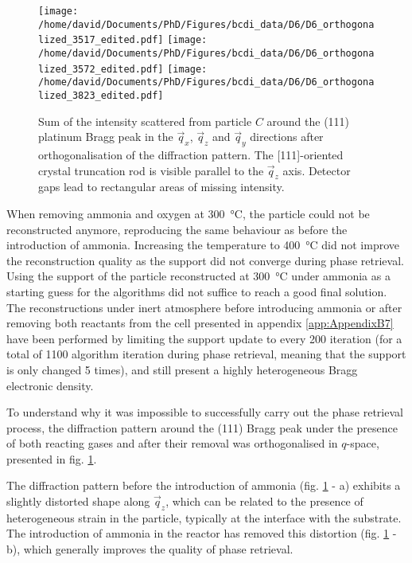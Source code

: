 \begin{figure}[!htb]
    \centering
    \texttt{[image: /home/david/Documents/PhD/Figures/bcdi\_data/D6/D6\_orthogonalized\_3517\_edited.pdf]}
    \texttt{[image: /home/david/Documents/PhD/Figures/bcdi\_data/D6/D6\_orthogonalized\_3572\_edited.pdf]}
    \texttt{[image: /home/david/Documents/PhD/Figures/bcdi\_data/D6/D6\_orthogonalized\_3823\_edited.pdf]}
    \caption{
        Sum of the intensity scattered from particle $C$ around the (111) platinum Bragg peak in the $\vec{q}_x$, $\vec{q}_z$ and $\vec{q}_y$ directions after orthogonalisation of the diffraction pattern.
        The [111]-oriented crystal truncation rod is visible parallel to the $\vec{q}_z$ axis.
        Detector gaps lead to rectangular areas of missing intensity.
    }
    \label{fig:D6Ortho}
\end{figure}

When removing ammonia and oxygen at \qty{300}{\degreeCelsius}, the particle could not be reconstructed anymore, reproducing the same behaviour as before the introduction of ammonia.
Increasing the temperature to \qty{400}{\degreeCelsius} did not improve the reconstruction quality as the support did not converge during phase retrieval.
Using the support of the particle reconstructed at \qty{300}{\degreeCelsius} under ammonia as a starting guess for the algorithms did not suffice to reach a good final solution.
The reconstructions under inert atmosphere before introducing ammonia or after removing both reactants from the cell presented in appendix \ref{app:AppendixB7} have been performed by limiting the support update to every 200 iteration (for a total of 1100 algorithm iteration during phase retrieval, meaning that the support is only changed 5 times), and still present a highly heterogeneous Bragg electronic density.

To understand why it was impossible to successfully carry out the phase retrieval process, the diffraction pattern around the (111) Bragg peak under the presence of both reacting gases and after their removal was orthogonalised in $q$-space, presented in fig. \ref{fig:D6Ortho}.

The diffraction pattern before the introduction of ammonia (fig. \ref{fig:D6Ortho} - a) exhibits a slightly distorted shape along $\vec{q}_z$, which can be related to the presence of heterogeneous strain in the particle, typically at the interface with the substrate.
The introduction of ammonia in the reactor has removed this distortion (fig. \ref{fig:D6Ortho} - b), which generally improves the quality of phase retrieval.

